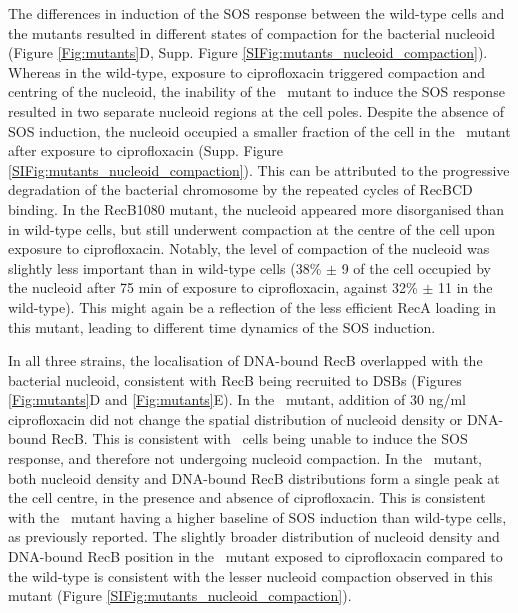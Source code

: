 The differences in induction of the SOS response between the wild-type cells and the mutants resulted in different states of compaction for the bacterial nucleoid (Figure \ref{Fig:mutants}D, Supp. Figure \ref{SIFig:mutants_nucleoid_compaction}). Whereas in the wild-type, exposure to ciprofloxacin triggered compaction and centring of the nucleoid, the inability of the \dreca\ mutant to induce the SOS response resulted in two separate nucleoid regions at the cell poles. Despite the absence of SOS induction, the nucleoid occupied a smaller fraction of the cell in the \dreca\ mutant after exposure to ciprofloxacin (Supp. Figure \ref{SIFig:mutants_nucleoid_compaction}). This can be attributed to the progressive degradation of the bacterial chromosome by the repeated cycles of RecBCD binding\cite{Capaldo1975,Skarstad1993}. In the RecB1080 mutant, the nucleoid appeared more disorganised than in wild-type cells, but still underwent compaction at the centre of the cell upon exposure to ciprofloxacin. Notably, the level of compaction of the nucleoid was slightly less important than in wild-type cells (38\% $\pm$ 9 of the cell occupied by the nucleoid after 75 min of exposure to ciprofloxacin, against 32\% $\pm$ 11 in the wild-type). This might again be a reflection of the less efficient RecA loading in this mutant, leading to different time dynamics of the SOS induction.

In all three strains, the localisation of DNA-bound RecB overlapped with the bacterial nucleoid, consistent with RecB being recruited to DSBs (Figures \ref{Fig:mutants}D and \ref{Fig:mutants}E). In the \dreca\ mutant, addition of 30 ng/ml ciprofloxacin did not change the spatial distribution of nucleoid density or DNA-bound RecB. This is consistent with \dreca\ cells being unable to induce the SOS response, and therefore not undergoing nucleoid compaction. In the \teneighty\ mutant, both nucleoid density and DNA-bound RecB distributions form a single peak at the cell centre, in the presence and absence of ciprofloxacin. This is consistent with the \teneighty\ mutant having a higher baseline of SOS induction than wild-type cells, as previously reported\cite{Lepore2023}. The slightly broader distribution of nucleoid density and DNA-bound RecB position in the \teneighty\ mutant exposed to ciprofloxacin compared to the wild-type is consistent with the lesser nucleoid compaction observed in this mutant (Figure \ref{SIFig:mutants_nucleoid_compaction}).

